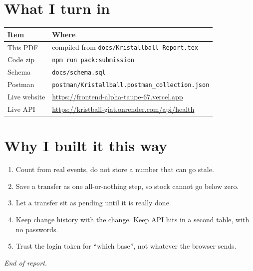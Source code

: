 \documentclass[11pt,a4paper]{article}
\newcommand{\livefront}{https://frontend-alpha-taupe-67.vercel.app}
\newcommand{\liveapi}{https://kristball-giat.onrender.com}
\begin{document}
\section{What I turn in}

\begin{center}
\begin{tabular}{ll}
\toprule
\textbf{Item} & \textbf{Where} \\
\midrule
This PDF & compiled from \texttt{docs/Kristallball-Report.tex} \\
Code zip & \texttt{npm run pack:submission} \\
Schema & \texttt{docs/schema.sql} \\
Postman & \texttt{postman/Kristallball.postman\_collection.json} \\
Live website & \url{\livefront} \\
Live API & \url{\liveapi/api/health} \\
\bottomrule
\end{tabular}
\end{center}

\section{Why I built it this way}

\begin{enumerate}
  \item Count from real events, do not store a number that can go stale.
  \item Save a transfer as one all-or-nothing step, so stock cannot go below zero.
  \item Let a transfer sit as pending until it is really done.
  \item Keep change history with the change. Keep API hits in a second table, with no passwords.
  \item Trust the login token for ``which base'', not whatever the browser sends.
\end{enumerate}

\vspace{1em}
\noindent\textit{End of report.}
\end{document}
